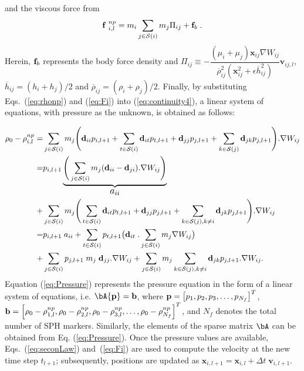 and the viscous force from \cite{pazouki2014}
\begin{equation}\label{eq:viscosity}
{\bf f}\;^{np}_{i,l}= m_i \sum_{j \in {\cal S}(i)} m_j \Pi _{ij}+{\bf f}_b\; .
\end{equation}
Herein, ${\bf f}_b$ represents the body force density and  $\Pi _{ij} \equiv -\dfrac{(\mu_i+\mu_j)\mathbf x_{ij}\nabla W_{ij} }{\overline{\rho}^2_{ij}(\mathbf x^2_{ij}+\epsilon \overline{h}^2_{ij})}\mathbf v_{ij,l}$,  $ \overline{h}_{ij}= (h_i+ h_j)/2$ and $ \overline{\rho}_{ij}= (\rho_i+ \rho_j)/2$.  Finally, by substituting Eqs.~(\ref{eq:rhonp}) and (\ref{eq:Fi}) into (\ref{eq:continuity4}), a linear system of equations, with pressure as the unknown, is obtained as follows:

\begin{equation}\label{eq:Pressure}
\begin{split}
\rho _0- \rho_{i,l}^{np}= & \sum_{j \in {\cal S}(i)} m_j \Bigg( \mathbf{d}_{ii} p_{i,l+1}+\sum_{t \in {\cal S}(i)} \mathbf{d}_{it} p_{t,l+1} + \mathbf{d}_{jj} p_{j,l+1}+\sum_{k \in {\cal S}(j)} \mathbf{d}_{jk} p_{j,l+1}\Bigg) .\nabla W_{ij}\\
=&p_{i,l+1}\underbrace{ \Bigg(  \sum_{j \in {\cal S}(i)} m_j ( \mathbf{d}_{ii}-\mathbf{d}_{ji}) . \nabla W_{ij}\Bigg ) }_{\text{\large $a_{ii}$}} \\ +& \sum_{j \in {\cal S}(i)} m_j\Bigg( \sum_{t \in {\cal S}(i)} \mathbf{d}_{it} p_{t,l+1}  + \mathbf{d}_{jj} p_{j,l+1}+\sum_{k \in {\cal S}(j), k\neq i} \mathbf{d}_{jk} p_{j,l+1}\Bigg). \nabla W_{ij}\\
=&p_{i,l+1} \; a_{ii} +  \sum_{t \in {\cal S}(i)} p_{t,l+1} \big(\mathbf{d}_{it} \;. \sum_{j \in {\cal S}(i)} m_j \nabla W_{ij}\big) \\ +& \sum_{j \in {\cal S}(i)} p_{j,l+1}  \; m_j \; \mathbf{d}_{jj}. \nabla W_{ij} + \sum_{j \in {\cal S}(i)} m_j  \sum_{k \in {\cal S}(j), k\neq i} \mathbf{d}_{jk} p_{j,l+1}. \nabla W_{ij}.
\end{split} 
\end{equation}
Equation (\ref{eq:Pressure}) represents the pressure equation in the form of a linear system of equations, i.e. $\bA {\bf p}={\bf b}$, where ${\bf p} = \left[ p_1, p_2, p_3, \ldots, p_{N_f} \right]^T$, ${\bf b} = \left[ \rho_0-\rho_{1,l}^{np}, \rho_0-\rho_{2,l}^{np}, \rho_0-\rho_{3,l}^{np},\ldots, \rho_0-\rho_{N_f}^{np}\right]^T$, and $N_f$ denotes the total number of SPH markers.  Similarly, the elements of the sparse matrix $\bA$ can be obtained from Eq. (\ref{eq:Pressure}). 
%
Once the pressure values are available, Eqs.~(\ref{eq:seconLaw}) and~(\ref{eq:Fi}) are used to compute the velocity at the new time step $t_{l+1}$; subsequently, positions are updated as $\mathbf{x}_{i,l+1}=\mathbf{x}_{i,l}+ \Delta t \; \mathbf{v}_{i,l+1}$. 

